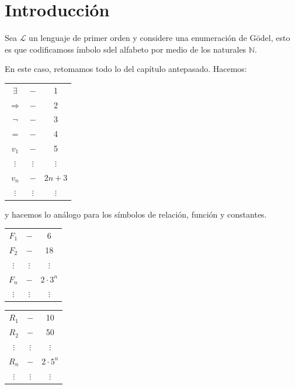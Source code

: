 \documentclass[12pt]{report}
\theoremstyle{largebreak}
\begin{document}
    \section{Introducción}

    Sea $\mathcal{L}$ un lenguaje de primer orden y considere una enumeración de Gödel, esto es que codificamoss ímbolo sdel alfabeto por medio de los naturales $\mathbb{N}$.

    En este caso, retomamos todo lo del capítulo antepasado. Hacemos:
    \begin{center}
        \begin{tabular}{ccc}
            \hline
            $\exists$ & $-$ & 1 \\
            $\Rightarrow$ & $-$ & 2 \\
            $\neg$ & $-$ & 3 \\
            $=$ & $-$ & 4 \\
            $v_1$ & $-$ & 5 \\
            $\vdots$ & $\vdots$ & $\vdots$ \\
            $v_n$ & $-$ & $2n+3$ \\
            $\vdots$ & $\vdots$ & $\vdots$ \\
            \hline
        \end{tabular}
    \end{center}
    y hacemos lo análogo para los símbolos de relación, función y constantes.

    \begin{center}
        \begin{tabular}{ccc}
            \hline
            $F_1$ & $-$ & 6 \\
            $F_2$ & $-$ &  18\\
            $\vdots$ & $\vdots$ & $\vdots$ \\
            $F_n$ & $-$ & $2\cdot3^n$ \\
            $\vdots$ & $\vdots$ & $\vdots$ \\
            \hline
        \end{tabular}
    \end{center}

    \begin{center}
        \begin{tabular}{ccc}
            \hline
            $R_1$ & $-$ & 10 \\
            $R_2$ & $-$ &  50\\
            $\vdots$ & $\vdots$ & $\vdots$ \\
            $R_n$ & $-$ & $2\cdot5^n$ \\
            $\vdots$ & $\vdots$ & $\vdots$ \\
            \hline
        \end{tabular}
    \end{center}
\end{document}
